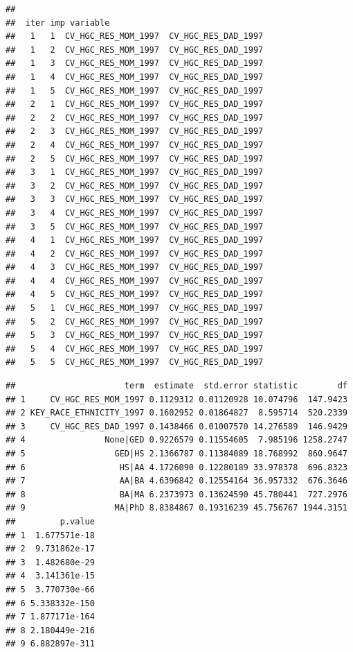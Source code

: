 \documentclass[
  man,floatsintext]{apa6}
\begin{document}
\begin{verbatim}
## 
##  iter imp variable
##   1   1  CV_HGC_RES_MOM_1997  CV_HGC_RES_DAD_1997
##   1   2  CV_HGC_RES_MOM_1997  CV_HGC_RES_DAD_1997
##   1   3  CV_HGC_RES_MOM_1997  CV_HGC_RES_DAD_1997
##   1   4  CV_HGC_RES_MOM_1997  CV_HGC_RES_DAD_1997
##   1   5  CV_HGC_RES_MOM_1997  CV_HGC_RES_DAD_1997
##   2   1  CV_HGC_RES_MOM_1997  CV_HGC_RES_DAD_1997
##   2   2  CV_HGC_RES_MOM_1997  CV_HGC_RES_DAD_1997
##   2   3  CV_HGC_RES_MOM_1997  CV_HGC_RES_DAD_1997
##   2   4  CV_HGC_RES_MOM_1997  CV_HGC_RES_DAD_1997
##   2   5  CV_HGC_RES_MOM_1997  CV_HGC_RES_DAD_1997
##   3   1  CV_HGC_RES_MOM_1997  CV_HGC_RES_DAD_1997
##   3   2  CV_HGC_RES_MOM_1997  CV_HGC_RES_DAD_1997
##   3   3  CV_HGC_RES_MOM_1997  CV_HGC_RES_DAD_1997
##   3   4  CV_HGC_RES_MOM_1997  CV_HGC_RES_DAD_1997
##   3   5  CV_HGC_RES_MOM_1997  CV_HGC_RES_DAD_1997
##   4   1  CV_HGC_RES_MOM_1997  CV_HGC_RES_DAD_1997
##   4   2  CV_HGC_RES_MOM_1997  CV_HGC_RES_DAD_1997
##   4   3  CV_HGC_RES_MOM_1997  CV_HGC_RES_DAD_1997
##   4   4  CV_HGC_RES_MOM_1997  CV_HGC_RES_DAD_1997
##   4   5  CV_HGC_RES_MOM_1997  CV_HGC_RES_DAD_1997
##   5   1  CV_HGC_RES_MOM_1997  CV_HGC_RES_DAD_1997
##   5   2  CV_HGC_RES_MOM_1997  CV_HGC_RES_DAD_1997
##   5   3  CV_HGC_RES_MOM_1997  CV_HGC_RES_DAD_1997
##   5   4  CV_HGC_RES_MOM_1997  CV_HGC_RES_DAD_1997
##   5   5  CV_HGC_RES_MOM_1997  CV_HGC_RES_DAD_1997
\end{verbatim}

\begin{verbatim}
##                      term  estimate  std.error statistic        df
## 1     CV_HGC_RES_MOM_1997 0.1129312 0.01120928 10.074796  147.9423
## 2 KEY_RACE_ETHNICITY_1997 0.1602952 0.01864827  8.595714  520.2339
## 3     CV_HGC_RES_DAD_1997 0.1438466 0.01007570 14.276589  146.9429
## 4                None|GED 0.9226579 0.11554605  7.985196 1258.2747
## 5                  GED|HS 2.1366787 0.11384089 18.768992  860.9647
## 6                   HS|AA 4.1726090 0.12280189 33.978378  696.8323
## 7                   AA|BA 4.6396842 0.12554164 36.957332  676.3646
## 8                   BA|MA 6.2373973 0.13624590 45.780441  727.2976
## 9                  MA|PhD 8.8384867 0.19316239 45.756767 1944.3151
##         p.value
## 1  1.677571e-18
## 2  9.731862e-17
## 3  1.482680e-29
## 4  3.141361e-15
## 5  3.770730e-66
## 6 5.338332e-150
## 7 1.877171e-164
## 8 2.180449e-216
## 9 6.882897e-311
\end{verbatim}
\end{document}
